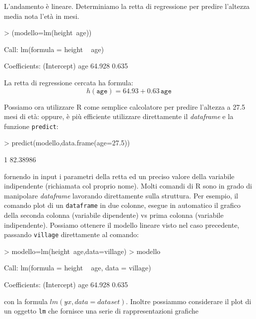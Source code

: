 \documentclass[onecolumn,12pt]{book}
\begin{document}
L'andamento \`e lineare. Determiniamo la retta di regressione
per predire l'altezza media nota l'et\`a in mesi.
\begin{Schunk}
\begin{Sinput}
> (modello=lm(height~age))
\end{Sinput}
\begin{Soutput}
Call:
lm(formula = height ~ age)

Coefficients:
(Intercept)          age  
     64.928        0.635  
\end{Soutput}
\end{Schunk}
La retta di regressione cercata ha formula:
$$h(\texttt{age})=64.93+ 0.63\, \texttt{age}$$

Possiamo ora utilizzare \textsf{R} come semplice calcolatore per predire l'altezza a 27.5 mesi di et\`a:
oppure, \`e pi\`u  efficiente utilizzare direttamente il \emph{dataframe} e la funzione
\texttt{predict}:
\begin{Schunk}
\begin{Sinput}
> predict(modello,data.frame(age=27.5))
\end{Sinput}
\begin{Soutput}
       1 
82.38986 
\end{Soutput}
\end{Schunk}
fornendo in input i parametri della retta ed un preciso valore della variabile indipendente (richiamata col proprio nome).
Molti comandi di \textsf{R} sono in grado di manipolare \emph{dataframe}  lavorando direttamente sulla struttura. Per esempio, il comando plot di un \texttt{dataframe} in due colonne, esegue in automatico il grafico della seconda colonna (variabile dipendente) vs prima colonna (variabile indipendente).
Possiamo ottenere il modello lineare visto nel caso precedente, passando \texttt{village} direttamente al comando:
\begin{Schunk}
\begin{Sinput}
> modello=lm(height~age,data=village)
> modello
\end{Sinput}
\begin{Soutput}
Call:
lm(formula = height ~ age, data = village)

Coefficients:
(Intercept)          age  
     64.928        0.635  
\end{Soutput}
\end{Schunk}
con la formula $lm(y \tilde{} x,data=dataset)$.
Inoltre possiammo considerare il plot di un oggetto \texttt{lm}  che fornisce una serie di rappresentazioni grafiche
\begin{Schunk}
\end{Schunk}
\end{document}
